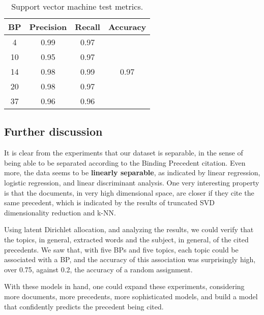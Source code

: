         \begin{table}[H]
                \centering
                \caption{Support vector machine test metrics.}
                \label{tab:svm}
                \begin{tabular}{c|cc|c}
                BP & Precision & Recall & Accuracy              \\ \hline
                4  & 0.99      & 0.97   & \multirow{5}{*}{0.97} \\
                10 & 0.95      & 0.97   &                       \\
                14 & 0.98      & 0.99   &                       \\
                20 & 0.98      & 0.97   &                       \\
                37 & 0.96      & 0.96   &                      
                \end{tabular}
        \end{table}

    \subsection{Further discussion}

        It is clear from the experiments that our dataset is separable, in the sense of being able to be separated according to the Binding Precedent citation. Even more, the data seems to be \textbf{linearly separable}, as indicated by linear regression, logistic regression, and linear discriminant analysis. One very interesting property is that the documents, in very high dimensional space, are closer if they cite the same precedent, which is indicated by the results of truncated SVD dimensionality reduction and k-NN.

        Using latent Dirichlet allocation, and analyzing the results, we could verify that the topics, in general, extracted words and the subject, in general, of the cited precedents. We saw that, with five BPs and five topics, each topic could be associated with a BP, and the accuracy of this association was surprisingly high, over 0.75, against 0.2, the accuracy of a random assignment.

        With these models in hand, one could expand these experiments, considering more documents, more precedents, more sophisticated models, and build a model that confidently predicts the precedent being cited.

